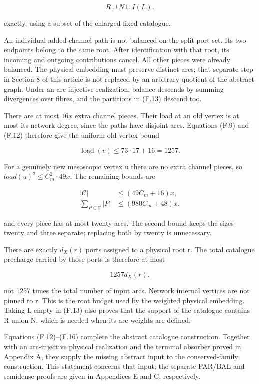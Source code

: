 \documentclass[english,11pt,a4paper]{article}
\begin{document}
\[R\cup N\cup I(L).\tag{F.13}\]

exactly, using a subset of the enlarged fixed catalogue.

An individual added channel path is not balanced on the split port set. Its two endpoints belong to the same root. After identification with that root, its incoming and outgoing contributions cancel. All other pieces were already balanced. The physical embedding must preserve distinct arcs; that separate step in Section 8 of this article is not replaced by an arbitrary quotient of the abstract graph. Under an arc-injective realization, balance descends by summing divergences over fibres, and the partitions in (F.13) descend too.

There are at most \(16x\) extra channel pieces. Their load at an old vertex is at most its network degree, since the paths have disjoint arcs. Equations (F.9) and (F.12) therefore give the uniform old-vertex bound

\[\operatorname{load}(v)\le73\cdot17+16=1257.\tag{F.14}\]

For a genuinely new mesoscopic vertex u there are no extra channel pieces, so \(load(u)^{2}\le C_{m}^{2}\cdot 49x\). The remaining bounds are

\[\begin{aligned}|\mathcal C|&\le(49C_m+16)x,\\\sum_{P\in\mathcal C}|P|&\le(980C_m+48)x.\end{aligned}\tag{F.15}\]

and every piece has at most twenty arcs. The second bound keeps the sizes twenty and three separate; replacing both by twenty is unnecessary.

There are exactly \(d_{X}(r)\) ports assigned to a physical root r. The total catalogue precharge carried by those ports is therefore at most

\[1257d_X(r).\tag{F.16}\]

not 1257 times the total number of input arcs. Network internal vertices are not pinned to r. This is the root budget used by the weighted physical embedding. Taking L empty in (F.13) also proves that the support of the catalogue contains R union N, which is needed when its arc weights are defined.

Equations (F.12)--(F.16) complete the abstract catalogue construction. Together with an arc-injective physical realization and the terminal absorber proved in Appendix A, they supply the missing abstract input to the conserved-family construction. This statement concerns that input; the separate PAR/BAL and semidense proofs are given in Appendices E and C, respectively.
\end{document}
